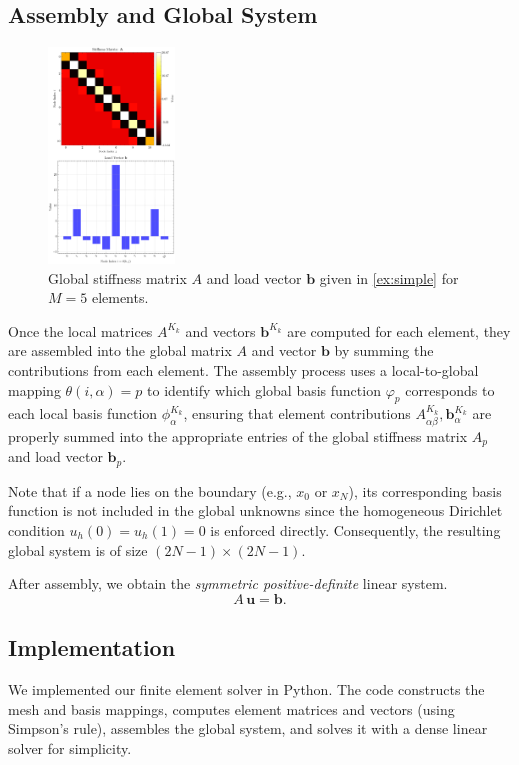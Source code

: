 \documentclass[a4paper,10pt]{article}
\begin{document}
\subsection{Assembly and Global System}
\begin{figure}
	\centering
	\includegraphics[width=0.3\textwidth]{figures/stiffness_matrix_complex.png}
	\caption{Global stiffness matrix \(A\) and load vector \(\mathbf{b}\) given in \ref{ex:simple} for \(M=5\) elements.}
	\label{fig:stiffness_load}
\end{figure}
Once the local matrices \(A^{K_k}\) and vectors \(\symbf{b}^{K_k}\) are computed for each element, they are assembled into the global matrix \(A\) and vector \(\mathbf{b}\) by summing the contributions from each element.
The assembly process uses a local-to-global mapping \(\theta(i,\alpha)=p\) to identify which global basis function \(\varphi_p\) corresponds to each local basis function \(\phi_\alpha^{K_k}\), ensuring that element contributions \(A^{K_k}_{\alpha\beta}, \symbf{b}^{K_k}_\alpha\) are properly summed into the appropriate entries of the global stiffness matrix  \(A_p\) and load vector \(\mathbf{b}_p\).

Note that if a node lies on the boundary (e.g., \(x_0\) or \(x_N\)), its corresponding basis function is not included in the global unknowns since the homogeneous Dirichlet condition \(u_h(0)=u_h(1)=0\) is enforced directly.
Consequently, the resulting global system is of size \((2N-1) \times (2N-1)\).

After assembly, we obtain the \emph{symmetric positive-definite} linear system.
\[
	A\,\mathbf{u} = \mathbf{b}.
\]

\subsection{Implementation}
We implemented our finite element solver in Python.
The code constructs the mesh and basis mappings, computes element matrices and vectors (using Simpson's rule),
assembles the global system, and solves it with a dense linear solver for simplicity.
\end{document}

